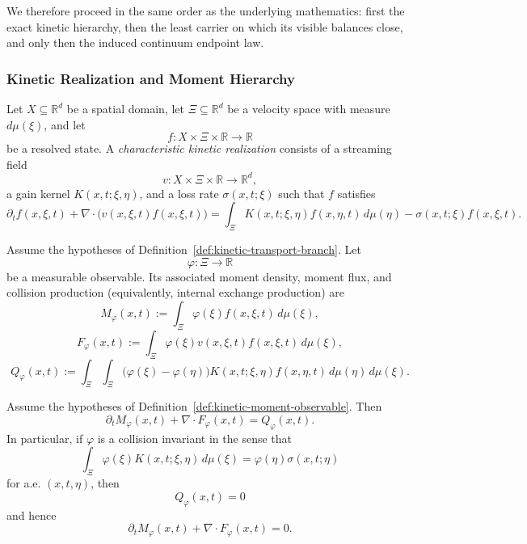 We therefore proceed in the same order as the underlying mathematics: first
the exact kinetic hierarchy, then the least carrier on which its visible
balances close, and only then the induced continuum endpoint law.

\subsubsection{Kinetic Realization and Moment Hierarchy}

\begin{definition}
\label{def:kinetic-transport-branch}
Let \(X\subseteq \mathbb R^d\) be a spatial domain, let \(\Xi\subseteq \mathbb
R^d\) be a velocity space with measure \(d\mu(\xi)\), and let
\[
f : X\times \Xi\times \mathbb R \to \mathbb R
\]
be a resolved state. A \emph{characteristic kinetic realization} consists of a streaming
field
\[
v : X\times \Xi\times \mathbb R \to \mathbb R^d,
\]
a gain kernel \(K(x,t;\xi,\eta)\), and a loss rate \(\sigma(x,t;\xi)\) such
that \(f\) satisfies
\[
\partial_t f(x,\xi,t)
+
\nabla\!\cdot\bigl(v(x,\xi,t)f(x,\xi,t)\bigr)
=
\int_\Xi K(x,t;\xi,\eta)f(x,\eta,t)\,d\mu(\eta)
-\sigma(x,t;\xi)f(x,\xi,t).
\]
\end{definition}

\begin{definition}
\label{def:kinetic-moment-observable}
Assume the hypotheses of Definition~\ref{def:kinetic-transport-branch}. Let
\[
\varphi:\Xi\to\mathbb R
\]
be a measurable observable. Its associated moment density, moment flux, and
collision production (equivalently, internal exchange production) are
\[
M_\varphi(x,t)
:=
\int_\Xi \varphi(\xi)f(x,\xi,t)\,d\mu(\xi),
\]
\[
F_\varphi(x,t)
:=
\int_\Xi \varphi(\xi)v(x,\xi,t)f(x,\xi,t)\,d\mu(\xi),
\]
\[
Q_\varphi(x,t)
:=
\int_\Xi\int_\Xi
\bigl(\varphi(\xi)-\varphi(\eta)\bigr)
K(x,t;\xi,\eta)f(x,\eta,t)\,d\mu(\eta)\,d\mu(\xi).
\]
\end{definition}

\begin{theorem}
\label{thm:kinetic-moment-hierarchy}
Assume the hypotheses of Definition~\ref{def:kinetic-moment-observable}. Then
\[
\partial_t M_\varphi(x,t)
+
\nabla\!\cdot F_\varphi(x,t)
=
Q_\varphi(x,t).
\]
In particular, if \(\varphi\) is a collision invariant in the sense that
\[
\int_\Xi \varphi(\xi)K(x,t;\xi,\eta)\,d\mu(\xi)
=
\varphi(\eta)\sigma(x,t;\eta)
\]
for a.e. \((x,t,\eta)\), then
\[
Q_\varphi(x,t)=0
\]
and hence
\[
\partial_t M_\varphi(x,t)
+
\nabla\!\cdot F_\varphi(x,t)=0.
\]
\end{theorem}

